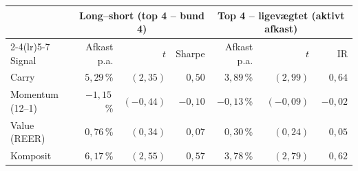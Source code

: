\begin{tabular}{lrrrrrr}
\toprule
 & \multicolumn{3}{c}{Long--short (top 4 -- bund 4)} & \multicolumn{3}{c}{Top 4 -- ligevægtet (aktivt afkast)} \\
\cmidrule(lr){2-4}\cmidrule(lr){5-7}
Signal & Afkast p.a. & $t$ & Sharpe & Afkast p.a. & $t$ & IR \\
\midrule
Carry & $5{,}29$\,\% & $(2{,}35)$ & $0{,}50$ & $3{,}89$\,\% & $(2{,}99)$ & $0{,}64$ \\
Momentum (12--1) & $-1{,}15$\,\% & $(-0{,}44)$ & $-0{,}10$ & $-0{,}13$\,\% & $(-0{,}09)$ & $-0{,}02$ \\
Value (REER) & $0{,}76$\,\% & $(0{,}34)$ & $0{,}07$ & $0{,}30$\,\% & $(0{,}24)$ & $0{,}05$ \\
Komposit & $6{,}17$\,\% & $(2{,}55)$ & $0{,}57$ & $3{,}78$\,\% & $(2{,}79)$ & $0{,}62$ \\
\bottomrule
\end{tabular}

